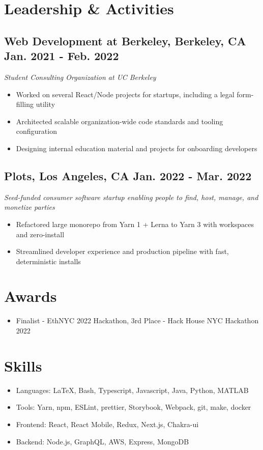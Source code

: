 \documentclass{article}
\begin{document}
	\section{Leadership \& Activities}

	\subsection{
		\textbf{Web Development at Berkeley}, Berkeley, CA
		{\hspace{\fill}\bfseries Jan. 2021 - Feb. 2022}
	}
	{\itshape Student Consulting Organization at UC Berkeley}
	\begin{itemize}
		\item Worked on several React/Node projects for startups, including a legal form-filling utility
		\item Architected scalable organization-wide code standards and tooling configuration
		\item Designing internal education material and projects for onboarding developers
	\end{itemize}

	\vspace{14pt}

	\subsection{
		\textbf{Plots}, Los Angeles, CA
		{\hspace{\fill}\bfseries Jan. 2022 - Mar. 2022}
	}
	{\itshape Seed-funded consumer software startup enabling people to find, host, manage, and monetize parties}
    \begin{itemize}
		\item Refactored large monorepo from Yarn 1 + Lerna to Yarn 3 with workspaces and zero-install
		\item Streamlined developer experience and production pipeline with fast, deterministic installs
	\end{itemize}

	\section{Awards}
	\vspace{3pt}
	\begin{itemize}
		\item Finalist - EthNYC 2022 Hackathon, 3rd Place - Hack House NYC Hackathon 2022
	\end{itemize}

	\section{Skills}
	\vspace{3pt}
	\begin{itemize}
		\item Languages: \LaTeX, Bash, Typescript, Javascript, Java, Python, MATLAB
		\item Tools: Yarn, npm, ESLint, prettier, Storybook, Webpack, git, make, docker
		\item Frontend: React, React Mobile, Redux, Next.js, Chakra-ui
		\item Backend: Node.js, GraphQL, AWS, Express, MongoDB
	\end{itemize}
\end{document}

